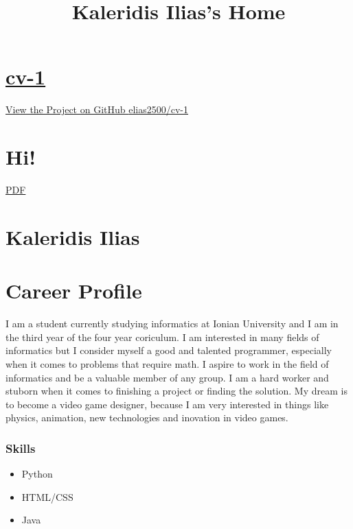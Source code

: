 \documentclass[american,]{article}
\title{Kaleridis Ilias's Home}
\date{}
\begin{document}
\maketitle

\hypertarget{cv-1}{%
\section{\texorpdfstring{\href{https://elias2500.github.io/cv-1/}{cv-1}}{cv-1}}\label{cv-1}}

\href{https://github.com/elias2500/cv-1}{View the Project on GitHub
{elias2500/cv-1}}

\hypertarget{hi}{%
\section{Hi!}\label{hi}}

\href{pdf/index.pdf}{PDF}

\hypertarget{kaleridis-ilias}{%
\section{Kaleridis Ilias}\label{kaleridis-ilias}}

\hypertarget{career-profile}{%
\section{Career Profile}\label{career-profile}}

I am a student currently studying informatics at Ionian University and I
am in the third year of the four year coriculum. I am interested in many
fields of informatics but I consider myself a good and talented
programmer, especially when it comes to problems that require math. I
aspire to work in the field of informatics and be a valuable member of
any group. I am a hard worker and stuborn when it comes to finishing a
project or finding the solution. My dream is to become a video game
designer, because I am very interested in things like physics,
animation, new technologies and inovation in video games.

\hypertarget{skills}{%
\subsubsection{Skills}\label{skills}}

\begin{itemize}
\item
  Python
\item
  HTML/CSS
\item
  Java
\end{itemize}
\end{document}
